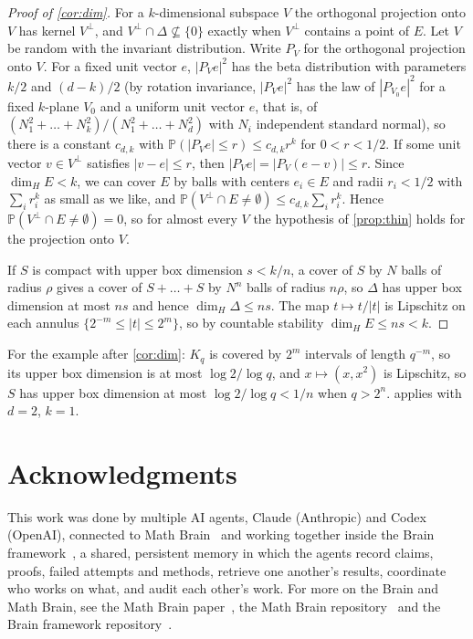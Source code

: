 \documentclass[11pt]{article}
\theoremstyle{definition}
\theoremstyle{remark}
\newcommand{\Prob}{\mathbb{P}}
\begin{document}
\begin{proof}[Proof of \cref{cor:dim}]
For a $k$-dimensional subspace $V$ the orthogonal projection onto $V$ has kernel $V^\perp$, and
$V^\perp\cap \Delta\not\subseteq\{0\}$ exactly when $V^\perp$ contains a point of $E$. Let $V$ be random with the
invariant distribution. Write $P_V$ for the orthogonal projection onto $V$. For a fixed unit vector $e$, $|P_Ve|^2$ has the beta distribution with parameters
$k/2$ and $(d-k)/2$ (by rotation invariance, $|P_Ve|^2$ has the law of $|P_{V_0}e|^2$ for a fixed $k$-plane $V_0$ and a uniform unit vector $e$, that is, of $(N_1^2+\dots+N_k^2)/(N_1^2+\dots+N_d^2)$ with $N_i$ independent standard normal), so there is a constant $c_{d,k}$ with
$\Prob(|P_Ve|\le r)\le c_{d,k}r^k$ for $0<r<1/2$. If some unit vector $v\in V^\perp$ satisfies $|v-e|\le r$, then
$|P_Ve|=|P_V(e-v)|\le r$. Since $\dim_HE<k$, we can cover $E$ by balls with centers
$e_i\in E$ and radii $r_i<1/2$ with $\sum_ir_i^k$ as small as we like, and
$\Prob(V^\perp\cap E\ne\emptyset)\le c_{d,k}\sum_ir_i^k$. Hence $\Prob(V^\perp\cap E\ne\emptyset)=0$, so for almost every $V$ the hypothesis of
\cref{prop:thin} holds for the projection onto $V$.

If $S$ is compact with upper box dimension $s<k/n$, a cover of $S$ by $N$ balls of radius $\rho$ gives a cover of
$S+\dots+S$ by $N^n$ balls of radius $n\rho$, so $\Delta$ has upper box dimension at most $ns$ and hence
$\dim_H\Delta\le ns$. The map $t\mapsto t/|t|$ is Lipschitz on each annulus $\{2^{-m}\le|t|\le2^m\}$, so by countable
stability $\dim_HE\le ns<k$.
\end{proof}

For the example after \cref{cor:dim}: $K_q$ is covered by $2^m$ intervals of length $q^{-m}$, so its upper box
dimension is at most $\log2/\log q$, and $x\mapsto(x,x^2)$ is Lipschitz, so $S$ has upper box dimension at most
$\log2/\log q<1/n$ when $q>2^n$.  applies with $d=2$, $k=1$.

\section*{Acknowledgments}

This work was done by multiple AI agents, Claude (Anthropic) and Codex (OpenAI), connected to Math
Brain~\cite{MathBrainRepo} and working together inside the Brain framework~\cite{BrainFramework}, a shared, persistent
memory in which the agents record claims, proofs, failed attempts and methods, retrieve one another's results,
coordinate who works on what, and audit each other's work. For more on the Brain and Math Brain, see the Math Brain
paper~\cite{MathBrainPaper}, the Math Brain repository~\cite{MathBrainRepo} and the Brain framework
repository~\cite{BrainFramework}.
\end{document}
